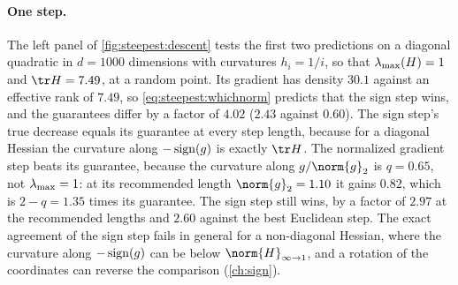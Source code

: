 \begin{refsection}
\paragraph{One step.} The left panel of \cref{fig:steepest:descent} tests the first two predictions on a diagonal quadratic in $d=1000$ dimensions with curvatures $h_i=1/i$, so that $\lambda_{\max}(H)=1$ and $\tr H=7.49$, at a random point. Its gradient has density $30.1$ against an effective rank of $7.49$, so \eqref{eq:steepest:whichnorm} predicts that the sign step wins, and the guarantees differ by a factor of $4.02$ ($2.43$ against $0.60$). The sign step's true decrease equals its guarantee at every step length, because for a diagonal Hessian the curvature along $-\operatorname{sign}(g)$ is exactly $\tr H$. The normalized gradient step beats its guarantee, because the curvature along $g/\norm{g}_2$ is $q=0.65$, not $\lambda_{\max}=1$: at its recommended length $\norm{g}_2=1.10$ it gains $0.82$, which is $2-q=1.35$ times its guarantee. The sign step still wins, by a factor of $2.97$ at the recommended lengths and $2.60$ against the best Euclidean step. The exact agreement of the sign step fails in general for a non-diagonal Hessian, where the curvature along $-\operatorname{sign}(g)$ can be below $\norm{H}_{\infty\to1}$, and a rotation of the coordinates can reverse the comparison (\cref{ch:sign}).


\end{refsection}

